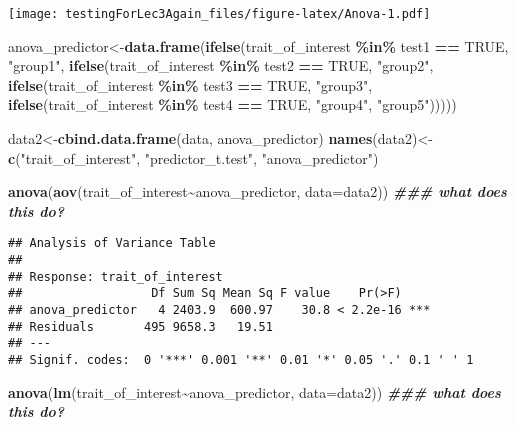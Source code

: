 \documentclass[
]{article}
\newenvironment{Shaded}{\begin{snugshade}}{\end{snugshade}}
\newcommand{\AttributeTok}[1]{\textcolor[rgb]{0.13,0.29,0.53}{#1}}
\newcommand{\ConstantTok}[1]{\textcolor[rgb]{0.56,0.35,0.01}{#1}}
\newcommand{\DocumentationTok}[1]{\textcolor[rgb]{0.56,0.35,0.01}{\textbf{\textit{#1}}}}
\newcommand{\FunctionTok}[1]{\textcolor[rgb]{0.13,0.29,0.53}{\textbf{#1}}}
\newcommand{\NormalTok}[1]{#1}
\newcommand{\OtherTok}[1]{\textcolor[rgb]{0.56,0.35,0.01}{#1}}
\newcommand{\SpecialCharTok}[1]{\textcolor[rgb]{0.81,0.36,0.00}{\textbf{#1}}}
\newcommand{\StringTok}[1]{\textcolor[rgb]{0.31,0.60,0.02}{#1}}
\begin{document}
\texttt{[image: testingForLec3Again\_files/figure-latex/Anova-1.pdf]}

\begin{Shaded}
\begin{Highlighting}[]
\NormalTok{anova\_predictor}\OtherTok{\textless{}{-}}\FunctionTok{data.frame}\NormalTok{(}\FunctionTok{ifelse}\NormalTok{(trait\_of\_interest }\SpecialCharTok{\%in\%}\NormalTok{ test1 }\SpecialCharTok{==} \ConstantTok{TRUE}\NormalTok{, }\StringTok{"group1"}\NormalTok{, }\FunctionTok{ifelse}\NormalTok{(trait\_of\_interest }\SpecialCharTok{\%in\%}\NormalTok{ test2 }\SpecialCharTok{==} \ConstantTok{TRUE}\NormalTok{, }\StringTok{"group2"}\NormalTok{, }\FunctionTok{ifelse}\NormalTok{(trait\_of\_interest }\SpecialCharTok{\%in\%}\NormalTok{ test3 }\SpecialCharTok{==} \ConstantTok{TRUE}\NormalTok{, }\StringTok{"group3"}\NormalTok{, }\FunctionTok{ifelse}\NormalTok{(trait\_of\_interest }\SpecialCharTok{\%in\%}\NormalTok{ test4 }\SpecialCharTok{==} \ConstantTok{TRUE}\NormalTok{, }\StringTok{"group4"}\NormalTok{, }\StringTok{"group5"}\NormalTok{)))))}

\NormalTok{data2}\OtherTok{\textless{}{-}}\FunctionTok{cbind.data.frame}\NormalTok{(data, anova\_predictor)}
\FunctionTok{names}\NormalTok{(data2)}\OtherTok{\textless{}{-}}\FunctionTok{c}\NormalTok{(}\StringTok{"trait\_of\_interest"}\NormalTok{, }\StringTok{"predictor\_t.test"}\NormalTok{, }\StringTok{"anova\_predictor"}\NormalTok{)}


\FunctionTok{anova}\NormalTok{(}\FunctionTok{aov}\NormalTok{(trait\_of\_interest}\SpecialCharTok{\textasciitilde{}}\NormalTok{anova\_predictor, }\AttributeTok{data=}\NormalTok{data2)) }\DocumentationTok{\#\#\# what does this do?}
\end{Highlighting}
\end{Shaded}

\begin{verbatim}
## Analysis of Variance Table
## 
## Response: trait_of_interest
##                  Df Sum Sq Mean Sq F value    Pr(>F)    
## anova_predictor   4 2403.9  600.97    30.8 < 2.2e-16 ***
## Residuals       495 9658.3   19.51                      
## ---
## Signif. codes:  0 '***' 0.001 '**' 0.01 '*' 0.05 '.' 0.1 ' ' 1
\end{verbatim}

\begin{Shaded}
\begin{Highlighting}[]
\FunctionTok{anova}\NormalTok{(}\FunctionTok{lm}\NormalTok{(trait\_of\_interest}\SpecialCharTok{\textasciitilde{}}\NormalTok{anova\_predictor, }\AttributeTok{data=}\NormalTok{data2)) }\DocumentationTok{\#\#\# what does this do? }
\end{Highlighting}
\end{Shaded}
\end{document}
